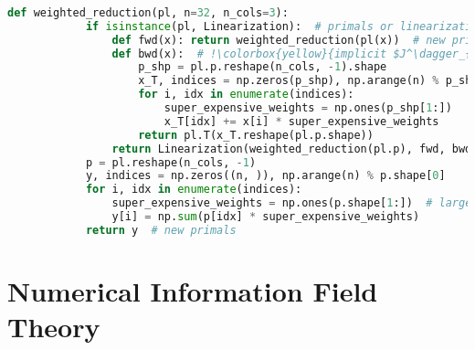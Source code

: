 \documentclass[aspectratio=169,xcolor=dvipsnames]{beamer}
\begin{document}
\begin{frame}[fragile]
	\frametitle{\insertsection}
	\framesubtitle{\insertsubsection}

	\vspace{-1em}
	\begin{lstlisting}[language=python,escapechar=!,basicstyle=\fontsize{9}{10}\selectfont\ttfamily]
		def weighted_reduction(pl, n=32, n_cols=3):
			if isinstance(pl, Linearization):  # primals or linearization
				def fwd(x): return weighted_reduction(pl(x))  # new primals
				def bwd(x):  # !\colorbox{yellow}{implicit $J^\dagger_{\mathrm{wr},\mathrm{pl.p}}$ which re-computes all weights}!
					p_shp = pl.p.reshape(n_cols, -1).shape
					x_T, indices = np.zeros(p_shp), np.arange(n) % p_shp[0]
					for i, idx in enumerate(indices):
						super_expensive_weights = np.ones(p_shp[1:])
						x_T[idx] += x[i] * super_expensive_weights
					return pl.T(x_T.reshape(pl.p.shape))
				return Linearization(weighted_reduction(pl.p), fwd, bwd)
			p = pl.reshape(n_cols, -1)
			y, indices = np.zeros((n, )), np.arange(n) % p.shape[0]
			for i, idx in enumerate(indices):
				super_expensive_weights = np.ones(p.shape[1:])  # large weights
				y[i] = np.sum(p[idx] * super_expensive_weights)
			return y  # new primals
	\end{lstlisting}
\end{frame}

\section{Numerical Information Field Theory}  %


\end{document}
